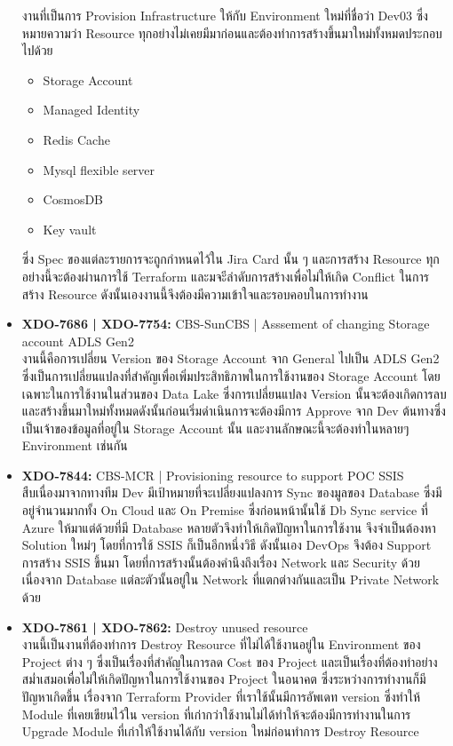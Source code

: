 \begin{itemize}
            งานที่เป็นการ Provision Infrastructure ให้กับ Environment ใหม่ที่ชื่อว่า Dev03 ซึ่งหมายความว่า Resource ทุกอย่างไม่เคยมีมาก่อนและต้องทำการสร้างขึ้นมาใหม่ทั้งหมดประกอบไปด้วย
            \begin{itemize}
                  \item Storage Account
                  \item Managed Identity
                  \item Redis Cache
                  \item Mysql flexible server
                  \item CosmosDB
                  \item Key vault
            \end{itemize}
            ซึ่ง Spec ของแต่ละรายการจะถูกกำหนดไว้ใน Jira Card นั้น ๆ และการสร้าง Resource ทุกอย่างนี้จะต้องผ่านการใช้ Terraform และมจะีลำดับการสร้างเพื่อไม่ให้เกิด Conflict ในการสร้าง Resource ดังนั้นเองงานนี้จึงต้องมีความเข้าใจและรอบคอบในการทำงาน
      \item \textbf{XDO-7686 | XDO-7754:} CBS-SunCBS | Asssement of changing Storage account ADLS Gen2\\
            งานนี้คือการเปลี่ยน Version ของ Storage Account จาก General ไปเป็น ADLS Gen2 ซึ่งเป็นการเปลี่ยนแปลงที่สำคัญเพื่อเพิ่มประสิทธิภาพในการใช้งานของ Storage Account โดยเฉพาะในการใช้งานในส่วนของ Data Lake ซึ่งการเปลี่ยนแปลง Version นั้นจะต้องเกิดการลบและสร้างขึ้นมาใหม่ทั้งหมดดังนั้นก่อนเริ่มดำเนินการจะต้องมีการ Approve จาก Dev ต้นทางซึ่งเป็นเจ้าของข้อมูลที่อยู่ใน Storage Account นั้น และงานลักษณะนี้จะต้องทำในหลายๆ Environment เช่นกัน
      \item \textbf{XDO-7844:} CBS-MCR | Provisioning resource to support POC SSIS\\
            สืบเนื่องมาจากทางทีม Dev มีเป้าหมายที่จะเปลี่ยงแปลงการ Sync ของมูลของ Database ซึ่งมีอยู่จำนวนมากทั้ง On Cloud และ On Premise ซึ่งก่อนหน้านั้นใช้ Db Sync service ที่ Azure ให้มาแต่ด้วยที่มี Database หลายตัวจึงทำให้เกิดปัญหาในการใช้งาน จึงจำเป็นต้องหา Solution ใหม่ๆ โดยที่การใช้ SSIS ก็เป็นอีกหนึ่งวิธี ดังนั้นเอง DevOps จึงต้อง Support การสร้าง SSIS ขึ้นมา โดยที่การสร้างนั้นต้องคำนึงถึงเรื่อง Network และ Security ด้วยเนื่องจาก Database แต่ละตัวนั้นอยู่ใน Network ที่แตกต่างกันและเป็น Private Network ด้วย
      \item \textbf{XDO-7861 | XDO-7862: } Destroy unused resource\\
            งานนี้เป็นงานที่ต้องทำการ Destroy Resource ที่ไม่ได้ใช้งานอยู่ใน Environment ของ Project ต่าง ๆ ซึ่งเป็นเรื่องที่สำคัญในการลด Cost ของ Project และเป็นเรื่องที่ต้องทำอย่างสม่ำเสมอเพื่อไม่ให้เกิดปัญหาในการใช้งานของ Project ในอนาคต ซึ่งระหว่างการทำงานก็มีปัญหาเกิดขึ้น เรื่องจาก Terraform Provider ที่เราใช้นั้นมีการอัพเดท version ซึ่งทำให้ Module ที่เคยเขียนไว้ใน version ที่เก่ากว่าใช้งานไม่ได้ทำให้จะต้องมีการทำงานในการ Upgrade Module ที่เก่าให้ใช้งานได้กับ version ใหม่ก่อนทำการ Destroy Resource

\end{itemize}

